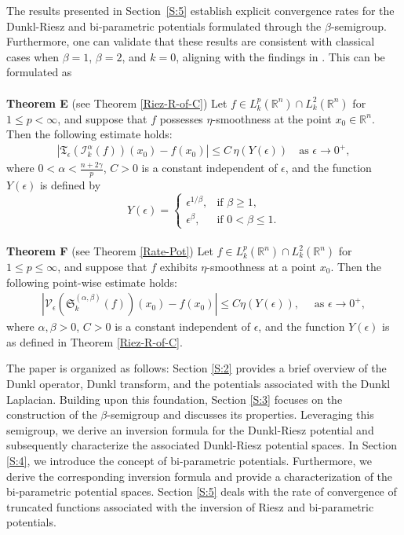 \documentclass[11pt,a4paper,reqno]{amsproc}
\theoremstyle{definition}
\theoremstyle{remark}
\numberwithin{equation}{section}
\begin{document}
The results presented in Section~\ref{S:5} establish explicit convergence rates for the Dunkl-Riesz and bi-parametric potentials formulated through the \(\beta\)-semigroup. Furthermore, one can validate that these results are consistent with classical cases when \(\beta = 1\), \(\beta = 2\), and \( k = 0 \), aligning with the findings in \cite{Aliev-2014, Aliev-2013}. This can be formulated as
\\
\\
\noindent \textbf{Theorem E} (see Theorem \ref{Riez-R-of-C}) 
    Let \( f \in L_k^p(\mathbb{R}^n) \cap L_k^2(\mathbb{R}^n) \) for \( 1 \leq p < \infty \), and suppose that \( f \) possesses \(\eta\)-smoothness at the point \( x_0 \in \mathbb{R}^n \). Then the following estimate holds:
\begin{align*}
    \left| \mathfrak{T}_\epsilon(\mathcal{I}_k^{\alpha}(f))(x_0)- f(x_0) \right| \leq C\,\eta(Y(\epsilon)) \quad \text{as } \epsilon \to 0^+,
\end{align*}
where \( 0 < \alpha < \frac{n+2\gamma}{p} \), \( C>0\) is a constant independent of \( \epsilon\), and the function \( Y(\epsilon) \) is defined by
\begin{equation*}
     Y(\epsilon) =   
\begin{cases} 
  \epsilon^{1/\beta}, & \text{if } \beta \geq 1, \\ 
  \epsilon^{\beta},   & \text{if } 0 < \beta \leq 1.
\end{cases}
\end{equation*}
\\
\noindent \textbf{Theorem F} (see Theorem \ref{Rate-Pot})
  Let $f \in L_k^p(\mathbb{R}^n)\cap L_k^2(\mathbb{R}^n)$ for $1\leq p \leq \infty$, and suppose that $f$ exhibits $\eta$-smoothness at a point $x_0$. Then the following point-wise estimate holds:
  \begin{align*}
      \left| \mathcal{V}_\epsilon\left( \mathfrak{S}_k^{(\alpha, \beta)}(f) \right)(x_0)-f(x_0) \right| \leq C\eta(Y(\epsilon)), \quad \text{ as $\epsilon \longrightarrow 0^+$}, 
  \end{align*}
  where $\alpha, \beta >0$, $C>0$ is a constant independent of $\epsilon$, and the function \(Y(\epsilon)\) is as defined in Theorem \ref{Riez-R-of-C}. 


The paper is organized as follows: Section \ref{S:2} provides a brief overview of the Dunkl operator, Dunkl transform, and the potentials associated with the Dunkl Laplacian. Building upon this foundation, Section \ref{S:3} focuses on the construction of the $\beta$-semigroup and discusses its properties. Leveraging this semigroup, we derive an inversion formula for the Dunkl-Riesz potential and subsequently characterize the associated Dunkl-Riesz potential spaces. In Section \ref{S:4}, we introduce the concept of bi-parametric potentials. Furthermore, we derive the corresponding inversion formula and provide a characterization of the bi-parametric potential spaces. Section \ref{S:5} deals with the rate of convergence of truncated functions associated with the inversion of Riesz and bi-parametric potentials.
\end{document}
